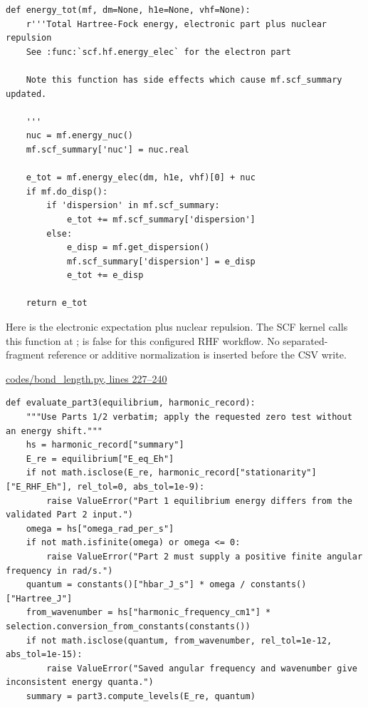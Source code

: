 \documentclass[10pt,a4paper]{article}
\begin{document}
\begin{Verbatim}
def energy_tot(mf, dm=None, h1e=None, vhf=None):
    r'''Total Hartree-Fock energy, electronic part plus nuclear repulsion
    See :func:`scf.hf.energy_elec` for the electron part

    Note this function has side effects which cause mf.scf_summary updated.

    '''
    nuc = mf.energy_nuc()
    mf.scf_summary['nuc'] = nuc.real

    e_tot = mf.energy_elec(dm, h1e, vhf)[0] + nuc
    if mf.do_disp():
        if 'dispersion' in mf.scf_summary:
            e_tot += mf.scf_summary['dispersion']
        else:
            e_disp = mf.get_dispersion()
            mf.scf_summary['dispersion'] = e_disp
            e_tot += e_disp

    return e_tot
\end{Verbatim}
Here  is the electronic expectation plus nuclear repulsion. The SCF kernel calls this function at ;  is false for this configured RHF workflow. No separated-fragment reference or additive normalization is inserted before the CSV write.

\href{/Users/novaz/Desktop/qml2.0/codes/bond\_length.py:227}{codes/bond\_length.py, lines 227–240}

\begin{Verbatim}
def evaluate_part3(equilibrium, harmonic_record):
    """Use Parts 1/2 verbatim; apply the requested zero test without an energy shift."""
    hs = harmonic_record["summary"]
    E_re = equilibrium["E_eq_Eh"]
    if not math.isclose(E_re, harmonic_record["stationarity"]["E_RHF_Eh"], rel_tol=0, abs_tol=1e-9):
        raise ValueError("Part 1 equilibrium energy differs from the validated Part 2 input.")
    omega = hs["omega_rad_per_s"]
    if not math.isfinite(omega) or omega <= 0:
        raise ValueError("Part 2 must supply a positive finite angular frequency in rad/s.")
    quantum = constants()["hbar_J_s"] * omega / constants()["Hartree_J"]
    from_wavenumber = hs["harmonic_frequency_cm1"] * selection.conversion_from_constants(constants())
    if not math.isclose(quantum, from_wavenumber, rel_tol=1e-12, abs_tol=1e-15):
        raise ValueError("Saved angular frequency and wavenumber give inconsistent energy quanta.")
    summary = part3.compute_levels(E_re, quantum)
\end{Verbatim}
\end{document}

